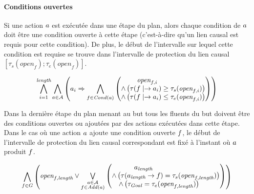 

\paragraph*{Conditions ouvertes} Si une action $a$ est exécutée dans une étape du plan, alors chaque condition de $a$ doit être une condition ouverte à cette étape (c'est-à-dire qu'un lien causal est requis pour cette condition). De plus, le début de l'intervalle sur lequel cette condition est requise se trouve dans l'intervalle de protection du lien causal $[\tau_{s}(\textit{open}_{f});\tau_{e}(\textit{open}_{f})]$.

\begin{small}
\[
\BigforallTwo{i=1}{\length}\bigwedge\limits_{\substack{\a\in \A}}%
\left(\a_{i} \Rightarrow \Bigforall{\substack{\f\in \cond{\a}}}\begin{pmatrix}\open{\f}{i}\hfill\\ \wedge \left(\tau(\f\mid\rightarrow\a_{i}) \geq \tau_{s}(\open{\f}{i})\right)\hfill\\
 \wedge \left(\tau(\f\mid\rightarrow\a_{i}) \leq \tau_{e}(\open{\f}{i})\right)\end{pmatrix}\right)%
\]
\end{small}

Dans la dernière étape du plan menant au but tous les fluents du but doivent être des conditions ouvertes ou ajoutées par des actions exécutées dans cette étape. Dans le cas où une action $a$ ajoute une condition ouverte $f$, le début de l'intervalle de protection du lien causal correspondant est fixé à l'instant où $a$ produit $f$.

\begin{small}
\[
\Bigforall{\substack{\f\in \G}}\begin{pmatrix}\open{\f}{\length} %
\vee \Bigexists{\substack{\a\in \A\\\f \in \add{\a}}}\begin{pmatrix}\a_{\length}\hfill\\
 \wedge \left(\tau(\a_{\length}\rightarrow \f) = \tau_{s}(\open{\f}{\length})\right)\hfill\\
  \wedge \left(\tau_{\mathit{Goal}} = \tau_{e}(\open{\f}{\length})\right)\hfill\end{pmatrix}\end{pmatrix}\hfill\\[-2em]
%
\]
\end{small}


